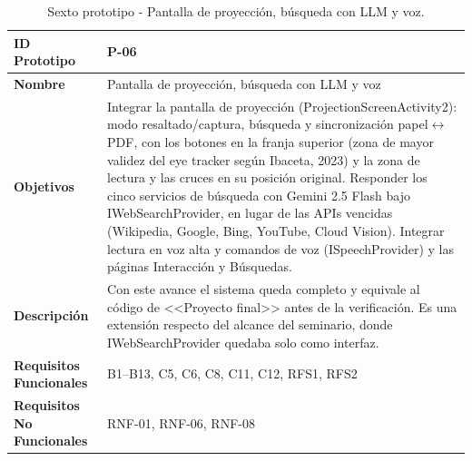 \begin{table}[H]
\centering
\caption{Sexto prototipo - Pantalla de proyección, búsqueda con LLM y voz.}
\label{tab:prototipo-p06}
\small
\begin{tabularx}{\textwidth}{>{\bfseries}l X}
\toprule
ID Prototipo & P-06 \\ \midrule
Nombre & Pantalla de proyección, búsqueda con LLM y voz \\ \midrule
Objetivos & Integrar la pantalla de proyección (ProjectionScreenActivity2): modo resaltado/captura, búsqueda y sincronización papel$\leftrightarrow$PDF, con los botones en la franja superior (zona de mayor validez del eye tracker según Ibaceta, 2023) y la zona de lectura y las cruces en su posición original. \newline Responder los cinco servicios de búsqueda con Gemini 2.5 Flash bajo IWebSearchProvider, en lugar de las APIs vencidas (Wikipedia, Google, Bing, YouTube, Cloud Vision). \newline Integrar lectura en voz alta y comandos de voz (ISpeechProvider) y las páginas Interacción y Búsquedas. \\ \midrule
Descripción & Con este avance el sistema queda completo y equivale al código de <<Proyecto final>> antes de la verificación. Es una extensión respecto del alcance del seminario, donde IWebSearchProvider quedaba solo como interfaz. \\ \midrule
Requisitos Funcionales & B1–B13, C5, C6, C8, C11, C12, RFS1, RFS2 \\ \midrule
Requisitos No Funcionales & RNF-01, RNF-06, RNF-08 \\ \bottomrule
\end{tabularx}
\end{table}
